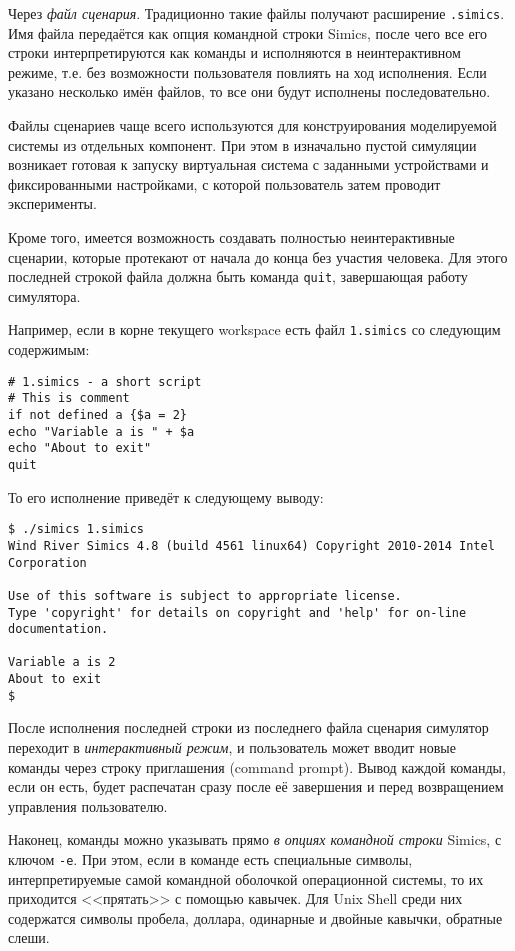 \begin{enumerate*}
\item Через \textit{файл сценария}. Традиционно такие файлы получают расширение \texttt{.simics}. Имя файла передаётся как опция командной строки Simics, после чего все его строки интерпретируются как команды и исполняются в неинтерактивном режиме, т.е. без возможности пользователя повлиять на ход исполнения. Если указано несколько имён файлов, то все они будут исполнены последовательно.

Файлы сценариев чаще всего используются для конструирования моделируемой системы из отдельных компонент. При этом в изначально пустой симуляции возникает готовая к запуску виртуальная система с заданными устройствами и фиксированными настройками, с которой пользователь затем проводит эксперименты.

Кроме того, имеется возможность создавать полностью неинтерактивные сценарии, которые протекают от начала до конца без участия человека. Для этого последней строкой файла должна быть команда \texttt{quit}, завершающая работу симулятора.

Например, если в корне текущего workspace есть файл \texttt{1.simics} со следующим содержимым:
\begin{lstlisting}
# 1.simics - a short script
# This is comment
if not defined a {$a = 2}
echo "Variable a is " + $a
echo "About to exit"
quit
\end{lstlisting}

То его исполнение приведёт к следующему выводу:
\begin{lstlisting}
$ ./simics 1.simics
Wind River Simics 4.8 (build 4561 linux64) Copyright 2010-2014 Intel Corporation

Use of this software is subject to appropriate license.
Type 'copyright' for details on copyright and 'help' for on-line documentation.

Variable a is 2
About to exit
$ 
\end{lstlisting}

\item  После исполнения последней строки из последнего файла сценария симулятор переходит в \textit{интерактивный режим}, и пользователь может вводит новые команды через строку приглашения (\abbr command prompt). Вывод каждой команды, если он есть, будет распечатан сразу после её завершения и перед возвращением управления пользователю.

\item Наконец, команды можно указывать прямо \textit{в опциях командной строки} Simics, с ключом \texttt{-e}. При этом, если в команде есть специальные символы, интерпретируемые самой командной оболочкой операционной системы, то их приходится <<прятать>> с помощью кавычек. Для Unix Shell среди них содержатся символы пробела, доллара, одинарные и двойные кавычки, обратные слеши.


\end{enumerate*}
